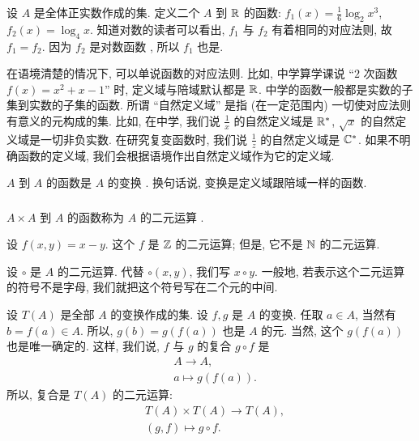\begin{example}
    设 $A$ 是全体正实数作成的集. 定义二个 $A$ 到 $\mathbb{R}$ 的函数: $f_1 (x) = \frac16 \log_{2} {x^3}$, $f_2 (x) = \log_{4} {x}$. 知道对数的读者可以看出, $f_1$ 与 $f_2$ 有着相同的对应法则, 故 $f_1 = f_2$. 因为 $f_2$ 是对数函数 , 所以 $f_1$ 也是.
\end{example}

\begin{remark}
    在语境清楚的情况下, 可以单说函数的对应法则. 比如, 中学算学课说 ``$2$ 次函数 $f(x) = x^2 + x - 1$'' 时, 定义域与陪域默认都是 $\mathbb{R}$. 中学的函数一般都是实数的子集到实数的子集的函数. 所谓 ``自然定义域'' 是指 (在一定范围内) 一切使对应法则有意义的元构成的集. 比如, 在中学, 我们说 $\frac{1}{x}$ 的自然定义域是 $\mathbb{R}^{\ast}$, $\sqrt{x}$ 的自然定义域是一切非负实数. 在研究复变函数时, 我们说 $\frac{1}{z}$ 的自然定义域是 $\mathbb{C}^{\ast}$. 如果不明确函数的定义域, 我们会根据语境作出自然定义域作为它的定义域.
\end{remark}

\begin{definition}
    $A$ 到 $A$ 的函数是 $A$ 的变换 . 换句话说, 变换是定义域跟陪域一样的函数.
\end{definition}

\subsubsection*{\BinaryFunctions}

\begin{definition}
    $A \times A$ 到 $A$ 的函数称为 $A$ 的二元运算 .
\end{definition}

\begin{example}
    设 $f(x,y) = x-y$. 这个 $f$ 是 $\mathbb{Z}$ 的二元运算; 但是, 它不是 $\mathbb{N}$ 的二元运算.
\end{example}

\begin{remark}
    设 $\circ$ 是 $A$ 的二元运算. 代替 $\circ (x,y)$, 我们写 $x \circ y$. 一般地, 若表示这个二元运算的符号不是字母, 我们就把这个符号写在二个元的中间.
\end{remark}

\begin{definition}
    设 $T(A)$ 是全部 $A$ 的变换作成的集. 设 $f,g$ 是 $A$ 的变换. 任取 $a \in A$, 当然有 $b = f(a) \in A$. 所以, $g(b) = g(f(a))$ 也是 $A$ 的元. 当然, 这个 $g(f(a))$ 也是唯一确定的. 这样, 我们说, $f$ 与 $g$ 的复合  $g \circ f$ 是
    \begin{align*}
         & A \to A, \tag*{$g \circ f \colon$} \\
         & a \mapsto g(f(a)).
    \end{align*}
    所以, 复合是 $T(A)$ 的二元运算:
    \begin{align*}
         & T(A) \times T(A) \to T(A), \tag*{$\circ \colon$} \\
         & (g,f) \mapsto g \circ f.
    \end{align*}
\end{definition}

